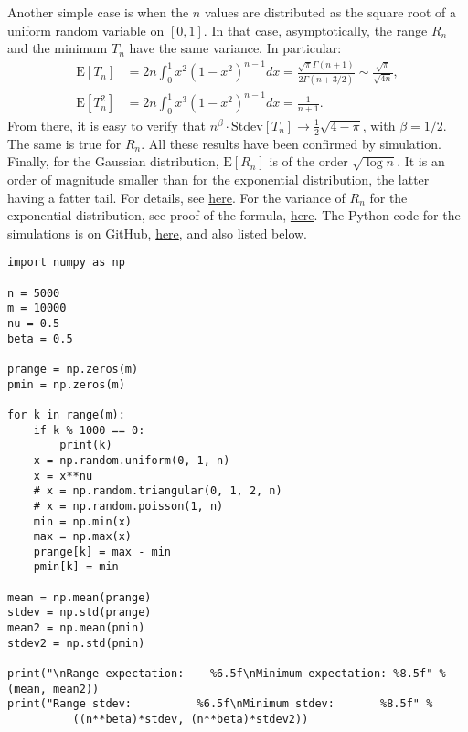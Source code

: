 \documentclass[oneside,10pt]{book}
\begin{document}
Another simple case is when the $n$ values are distributed as the square root of a uniform random variable on $[0, 1]$. In that case,
 asymptotically, the range $R_n$ and the minimum $T_n$ have the same variance. In particular:
\begin{align}
\text{E}[T_n] & = 2n\int_0^1 x^2(1-x^2)^{n-1} dx = \frac{\sqrt{\pi}\Gamma(n+1)}{2\Gamma(n + 3/2)} \sim \frac{\sqrt{\pi}}{\sqrt{4n}},
 \nonumber\\
\text{E}[T_n^2] & = 2n\int_0^1 x^3(1-x^2)^{n-1} dx = \frac{1}{n+1}. \nonumber
\end{align}
From there, it is easy to verify that $n^{\beta}\cdot\text{Stdev}[T_n] \rightarrow \frac{1}{2}\sqrt{4 - \pi}$, with $\beta = 1/2$. The same is true
 for $R_n$. All these results have been confirmed by simulation. Finally, for the Gaussian distribution,
 $\text{E}[R_n]$ is of the order $\sqrt{\log n}$. It is an order of magnitude smaller than for the exponential distribution, the latter having a fatter tail. For details, see \href{https://stats.stackexchange.com/questions/9001/approximate-order-statistics-for-normal-random-variables}{here}. For the variance of $R_n$ for the exponential distribution, see proof of the formula, \href{https://github.com/VincentGranville/Statistical-Optimization/blob/main/exporange.pdf}{here}. The Python code for the simulations is on GitHub,
 \href{https://github.com/VincentGranville/Statistical-Optimization/blob/main/Range_simulations.py}{here}, and also listed below.
\vspace{1ex}

\begin{lstlisting}
import numpy as np

n = 5000
m = 10000
nu = 0.5
beta = 0.5

prange = np.zeros(m)
pmin = np.zeros(m)

for k in range(m):
    if k % 1000 == 0:
        print(k)
    x = np.random.uniform(0, 1, n)
    x = x**nu
    # x = np.random.triangular(0, 1, 2, n)
    # x = np.random.poisson(1, n)
    min = np.min(x)
    max = np.max(x)
    prange[k] = max - min
    pmin[k] = min

mean = np.mean(prange)
stdev = np.std(prange)
mean2 = np.mean(pmin)
stdev2 = np.std(pmin)

print("\nRange expectation:    %6.5f\nMinimum expectation: %8.5f" %(mean, mean2))
print("Range stdev:          %6.5f\nMinimum stdev:       %8.5f" %
          ((n**beta)*stdev, (n**beta)*stdev2))


\end{lstlisting}
\end{document}
